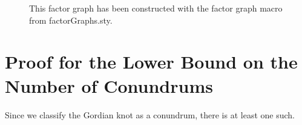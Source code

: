 \documentclass[11pt,a4paper,twoside]{report}
\begin{document}
\begin{figure}[h]
	\centering

  	\caption[Exemplary factor graph]
   	{This factor graph has been constructed with the factor graph macro from factorGraphs.sty.}
	\label{factor_graph}
\end{figure}





\clearpage

\appendix
\fancyhead[LO]{\rightmark}
\fancyhead[RO]{\scshape\appendixname\ \thechapter}
\fancyhead[LE]{\scshape\appendixname\ \thechapter}
\fancyhead[RE]{\textsc{\leftmark}}

\chapter[Proof of Upper Bound]{Proof for the Lower Bound on the Number of
  Conundrums}
Since we classify the Gordian knot as a conundrum, there is at least one such.

\clearpage

\fancyhead[LO]{\scshape\bibname}
\fancyhead[RO]{\scshape\appendixname}
\fancyhead[LE]{\scshape\appendixname}
\fancyhead[RE]{\scshape\bibname}



\end{document}
